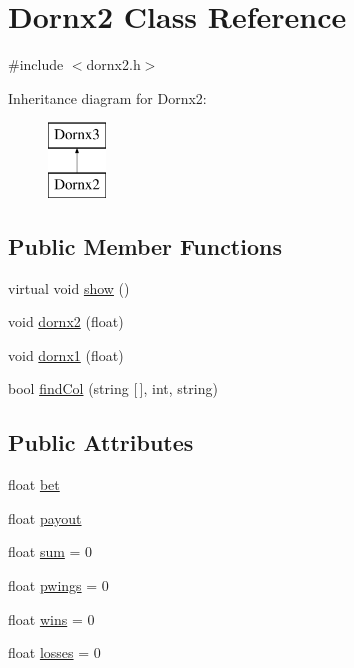 \hypertarget{class_dornx2}{}\section{Dornx2 Class Reference}
\label{class_dornx2}


{\ttfamily \#include $<$dornx2.\+h$>$}

Inheritance diagram for Dornx2\+:\begin{figure}[H]
\begin{center}
\leavevmode
\includegraphics[height=2.000000cm]{class_dornx2}
\end{center}
\end{figure}
\subsection*{Public Member Functions}
\begin{DoxyCompactItemize}
\item 
virtual void \hyperlink{class_dornx2_a358fdbc837f4bc24f66980a7153babe3}{show} ()
\item 
void \hyperlink{class_dornx2_aa3fcfcbe016f42f136e105e58d58baf7}{dornx2} (float)
\item 
void \hyperlink{class_dornx2_abec89827e72c13b981b5fbd169234463}{dornx1} (float)
\item 
bool \hyperlink{class_dornx2_adf347547aec5c4ff26a6a6650d992062}{find\+Col} (string \mbox{[}$\,$\mbox{]}, int, string)
\end{DoxyCompactItemize}
\subsection*{Public Attributes}
\begin{DoxyCompactItemize}
\item 
float \hyperlink{class_dornx2_a625cb1bab8577b56ad9fdd30429b2cc1}{bet}
\item 
float \hyperlink{class_dornx2_a39b0aa95ebb2d298ce227e3052e9ee1f}{payout}
\item 
float \hyperlink{class_dornx2_a9721d2b992a38ebf38b3d9ba1106ac24}{sum} = 0
\item 
float \hyperlink{class_dornx2_a08c22beb426bb80169c29bd6fe382781}{pwings} = 0
\item 
float \hyperlink{class_dornx2_aeb5ee2bf43b55d212169fe6842c4dda0}{wins} = 0
\item 
float \hyperlink{class_dornx2_a901e60654dd16c22ab2f5bbf69e7ee47}{losses} = 0
\end{DoxyCompactItemize}


